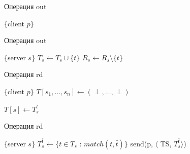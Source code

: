 \Conc

\printbibliography[heading=bibintoc]



\begin{algorithm}[H]
	\caption{Операция out}\label{alg1}
	\begin{algorithmic}[1]
		\Statex $\{$client $p \}$
		\State {}
		\EndFor
		\EndProcedure
	\end{algorithmic}
\end{algorithm}
\begin{algorithm}[H]
	\caption{Операция out}\label{alg2}
	\begin{algorithmic}[1]
		\Statex $\{$server $s \}$
		\State $T_s \gets T_s \cup \{t\}$
		\EndIf
		\State $R_s \gets R_s \setminus \{t\}$
		\EndUpon
	\end{algorithmic}
\end{algorithm}

\begin{algorithm}[H]
	\caption{Операция rd}\label{alg3}
	\begin{algorithmic}[1]
		\Statex $\{$client $p \}$
		\State $T[s_1, \dots, s_n] \gets (\perp, \dots, \perp)$
		
		\State {}
		\EndFor
		
		\Repeat
		\State {}
		\State $T[s] \gets T_s^{\bar t}$
		
		\State {}
		\EndIf
		\State \Return{$\perp$}
		\EndFunction
	\end{algorithmic}
\end{algorithm}
\begin{algorithm}[H]
	\caption{Операция rd}\label{alg4}
	\begin{algorithmic}[1]
		\Statex $\{$server $s \}$
		\State $T_s^{\bar t} \gets \{t \in T_s$ : $match(t, \bar t)\}$
		\State send(p, $\langle$ TS, $T_s^{\bar t}\rangle$)
		\EndUpon
	\end{algorithmic}
\end{algorithm}

